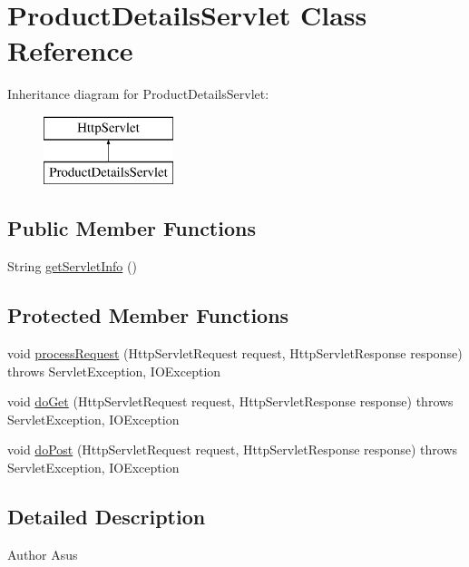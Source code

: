 \hypertarget{class_product_details_servlet}{}\section{Product\+Details\+Servlet Class Reference}
\label{class_product_details_servlet}
Inheritance diagram for Product\+Details\+Servlet\+:\begin{figure}[H]
\begin{center}
\leavevmode
\includegraphics[height=2.000000cm]{class_product_details_servlet}
\end{center}
\end{figure}
\subsection*{Public Member Functions}
\begin{DoxyCompactItemize}
\item 
String \mbox{\hyperlink{class_product_details_servlet_a19cbce0c3822e37fac263d0f5ec4a5c0}{get\+Servlet\+Info}} ()
\end{DoxyCompactItemize}
\subsection*{Protected Member Functions}
\begin{DoxyCompactItemize}
\item 
void \mbox{\hyperlink{class_product_details_servlet_a1da6975765e1785e6152905ec5fbcd2d}{process\+Request}} (Http\+Servlet\+Request request, Http\+Servlet\+Response response)  throws Servlet\+Exception, I\+O\+Exception 
\item 
void \mbox{\hyperlink{class_product_details_servlet_a802fc18615a1ded87cce7a4a821e179f}{do\+Get}} (Http\+Servlet\+Request request, Http\+Servlet\+Response response)  throws Servlet\+Exception, I\+O\+Exception 
\item 
void \mbox{\hyperlink{class_product_details_servlet_a27e8e3ffb9bd8315e0a9f5c459fb789d}{do\+Post}} (Http\+Servlet\+Request request, Http\+Servlet\+Response response)  throws Servlet\+Exception, I\+O\+Exception 
\end{DoxyCompactItemize}


\subsection{Detailed Description}
\begin{DoxyAuthor}{Author}
Asus 
\end{DoxyAuthor}


